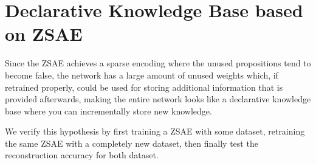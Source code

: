 \section{Declarative Knowledge Base based on ZSAE}

Since the ZSAE achieves a sparse encoding where the unused propositions
tend to become false, the network has a large amount of unused weights
which, if retrained properly, could be used for storing additional
information that is provided afterwards, making the entire network looks
like a declarative knowledge base where you can incrementally store
new knowledge.

We verify this hypothesis by first training a ZSAE with some dataset, retraining the same ZSAE with
a completely new dataset, then finally test the reconstruction accuracy for both dataset.
